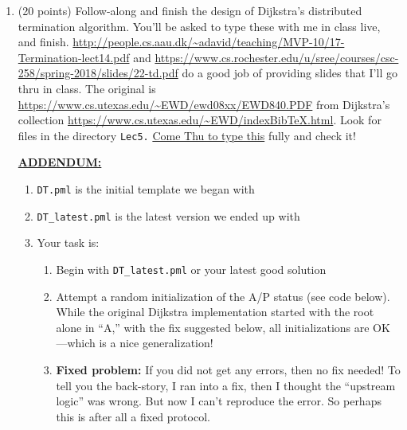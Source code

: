 \documentclass[11pt]{article}
\begin{document}
\begin{enumerate}
\clearpage

\item (20 points) Follow-along and finish the design of
  Dijkstra's distributed termination algorithm.
  You'll be asked to type these with me in class live, and
  finish.
  \url{http://people.cs.aau.dk/~adavid/teaching/MVP-10/17-Termination-lect14.pdf}
  and
  \url{https://www.cs.rochester.edu/u/sree/courses/csc-258/spring-2018/slides/22-td.pdf}
  do a good job of providing slides
  that I'll go thru in class.
  The original is
  \url{https://www.cs.utexas.edu/~EWD/ewd08xx/EWD840.PDF}
  from Dijkstra's collection
  \url{https://www.cs.utexas.edu/~EWD/indexBibTeX.html}.
  Look for files in the directory {\tt Lec5.}
  \underline{Come Thu to type this} fully and check it!

  \underline{\bf ADDENDUM:\/}
  \begin{enumerate}
  \item {\tt DT.pml} is the initial template we began with
  \item  {\tt DT\_latest.pml} is the latest version we ended up with
  \item Your task is:
    \begin{enumerate}
    \item Begin with {\tt DT\_latest.pml} or your latest good solution
    \item Attempt a random initialization of the A/P status (see code below).
      While the original Dijkstra implementation started with the root alone
      in ``A,'' with the fix suggested below, all initializations are OK---which
      is a nice generalization!

    \item {\bf Fixed problem:\/} If you did not get any errors, then no fix needed! To tell you
      the back-story, I ran into a fix, then I thought the ``upstream logic'' was wrong.
      But now I can't reproduce the error. So perhaps this is after all a fixed protocol.


\end{enumerate}
\end{enumerate}
\end{enumerate}
\end{document}
